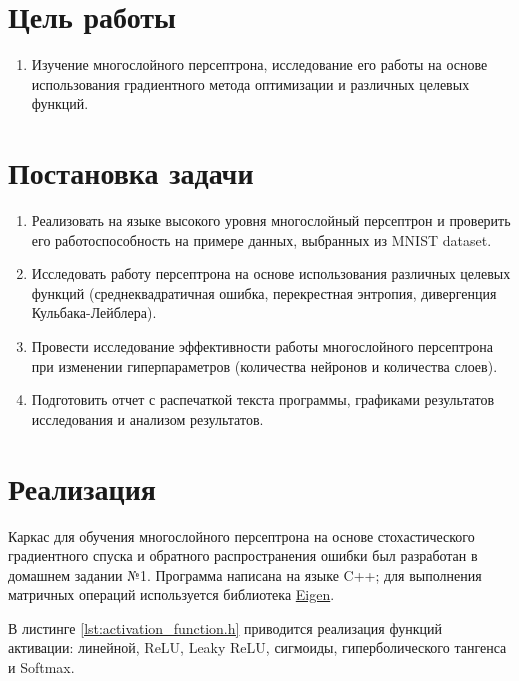 \documentclass[a4paper, 14pt]{extarticle}
\begin{document}
\renewcommand{\ttdefault}{pcr}

\setlength{\tabcolsep}{3pt}
\newpage
\setcounter{page}{2}

\section{Цель работы}

\begin{enumerate}
  \item Изучение многослойного персептрона, исследование его работы на основе использования градиентного метода оптимизации и различных целевых функций.
\end{enumerate}

\section{Постановка задачи}

\begin{enumerate}
  \item Реализовать на языке высокого уровня многослойный персептрон и проверить его работоспособность на примере данных, выбранных из MNIST dataset. 
  \item Исследовать работу персептрона на основе использования различных целевых функций (среднеквадратичная ошибка, перекрестная энтропия, дивергенция
    Кульбака-Лейблера).
  \item Провести исследование эффективности работы многослойного персептрона при изменении гиперпараметров (количества нейронов и количества слоев).
  \item Подготовить отчет с распечаткой текста программы, графиками результатов исследования и анализом результатов.
\end{enumerate}

\section{Реализация}

Каркас для обучения многослойного персептрона на основе стохастического градиентного спуска и обратного распространения ошибки был разработан в
домашнем задании №1. Программа написана на языке C++; для выполнения матричных операций используется библиотека
\href{https://eigen.tuxfamily.org/index.php?title=Main_Page}{Eigen}.

В листинге \ref{lst:activation_function.h} приводится реализация функций активации: линейной, ReLU, Leaky ReLU, сигмоиды, гиперболического
тангенса и Softmax.
\end{document}
